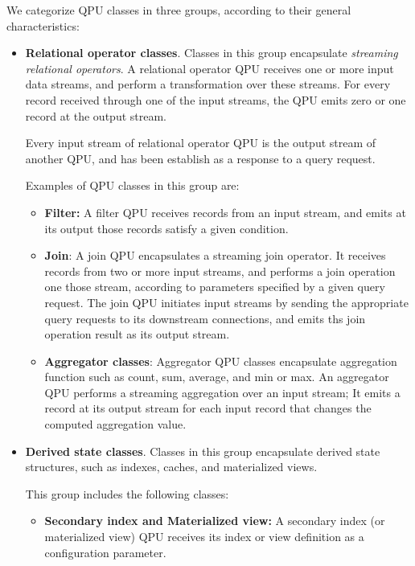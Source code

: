 We categorize QPU classes in three groups, according to their general characteristics:
\begin{itemize}
  \item \textbf{Relational operator classes}.
  Classes in this group encapsulate \textit{streaming relational operators}.
  A relational operator QPU receives one or more input data streams, and perform a transformation over these streams.
  For every record received through one of the input streams, the QPU emits zero or one record at the output stream.

  Every input stream of relational operator QPU is the output stream of another QPU, and has been establish as a response
  to a query request.

  Examples of QPU classes in this group are:
  \begin{itemize}
    \item \textbf{Filter:}
    A filter QPU receives records from an input stream, and  emits at its output those records satisfy a given condition.

    \item \textbf{Join}:
    A join QPU encapsulates a streaming join operator.
    It receives records from two or more input streams, and performs a join operation one those stream, according
    to parameters specified by a given query request.
    The join QPU initiates input streams by sending the appropriate query requests to its downstream connections,
    and emits ths join operation result as its output stream.

    \item \textbf{Aggregator classes}:
    Aggregator QPU classes encapsulate aggregation function such as count, sum, average, and min or max.
    An aggregator QPU performs a streaming aggregation over an input stream;
    It emits a record at its output stream for each input record that changes the computed aggregation value.
  \end{itemize}

  \item \textbf{Derived state classes}.
  Classes in this group encapsulate derived state structures, such as indexes, caches, and materialized views.

  This group includes the following classes:
  \begin{itemize}
    \item \textbf{Secondary index and Materialized view:}
    A secondary index (or materialized view) QPU receives its index or view definition as a configuration parameter.


\end{itemize}
\end{itemize}
